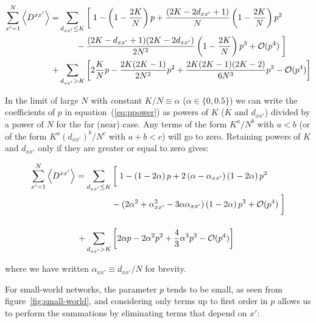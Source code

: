 
\begin{align}
  \sum_{x'=1}^N \left< D^{xx'} \right> = &\sum_{d_{xx'}\leq K} \left[ \vphantom{\frac{2K}{N}} \right. 1 - \left( 1 - \frac{2K}{N} \right) p + \frac{\left( 2K-2d_{xx'}+1 \right)}{N} \left( 1 - \frac{2K}{N} \right) p^2 \notag\\
  &\qquad - \frac{(2K-d_{xx'}+1)(2K-2d_{xx'})}{2N^2}\left( 1 - \frac{2K}{N} \right)p^3 + \mathcal{O}(p^4) \left. \vphantom{\frac{2K}{N}} \right] \notag\\
  +&\sum_{d_{xx'}> K} \left[ 2\frac{K}{N}p - \frac{2K(2K-1)}{2N^2}p^2 + \frac{2K(2K-1)(2K-2)}{6N^3}p^3 - \mathcal{O}(p^4) \right]
  \label{eq:ppower}
\end{align}

In the limit of large $N$ with {\textit constant} $K/N\equiv \alpha$ ($\alpha \in \{0, 0.5\}$) we can write the coefficients of $p$ in
equation~(\ref{eq:ppower}) as powers of $K$ ($K$ and $d_{xx'}$) divided by a power of $N$ for the far (near) case. Any terms of the
form $K^a/N^b$ with $a<b$ (or of the form $K^a(d_{xx'})^b/N^c$ with $a+b<c$) will go to zero. Retaining powers of $K$ and $d_{xx'}$
only if they are greater or equal to zero gives:

\begin{align}
  \sum_{x'=1}^N \left< D^{xx'} \right> = \sum_{d_{xx'}\leq K} &\left[ \vphantom{\frac{2K}{N}} \right. 1 - \left( 1 - 2\alpha \right) p + 2\left( \alpha-\alpha_{xx'} \right) \left( 1 - 2\alpha \right) p^2 \notag\\
  &- (2\alpha^2 + \alpha_{xx'}^2 - 3\alpha\alpha_{xx'})\left( 1 - 2\alpha \right)p^3 + \mathcal{O}(p^4) \left.  \vphantom{\frac{2K}{N}} \right] \notag\\[12pt]
  +\sum_{d_{xx'}> K} &\left[ 2\alpha p - 2\alpha^2 p^2 + \frac{4}{3}\alpha^3 p^3 - \mathcal{O}(p^4) \right]
  \label{eq:ppower2}
\end{align}

\noindent where we have written $\alpha_{xx'} \equiv d_{xx'}/N$ for brevity.

For small-world networks, the parameter $p$ tends to be small\cite{rodrigues2020synchronization}, as seen from
figure~\ref{fig:small-world}, and considering only terms up to first order in $p$ allows us to perform the summations by eliminating
terms that depend on $x'$:

